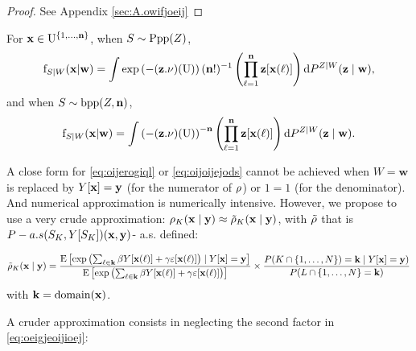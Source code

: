 \begin{proof}
See Appendix \ref{sec:A.owifjoeij}
\end{proof}



For $\mathbf{x}\in\mathrm{U}^{\{1,\ldots,\mathbf{n}\}}$, when $S\sim \mathrm{Ppp}(Z)$,
\begin{equation}\mathrm{f}_{S\mid W}(\mathbf{x}|\mathbf{w})=
\int\exp\left(-(\mathbf{z}.\nu)(\mathrm{U})\right)(\mathbf{n}!)^{-1}\left(\prod_{\ell=1}^{\mathbf{n}} \mathbf{z}[\mathbf{x}(\ell)]\right)\mathrm{d}
P^{Z\mid W}(\mathbf{z}\mid \mathbf{w}),\label{eq:oijoijejods}
\end{equation}
and when $S\sim \mathrm{bpp}(Z,\mathbf{n})$,
\begin{equation}
\mathrm{f}_{S\mid W}(\mathbf{x}|\mathbf{w})=
\int\left(-(\mathbf{z}.\nu)(\mathrm{U})\right)^{-\mathbf{n}}\left(\prod_{\ell=1}^{\mathbf{n}} \mathbf{z}[\mathbf{x}(\ell)]\right)\mathrm{d}
P^{Z\mid W}(\mathbf{z}\mid \mathbf{w}).\label{eq:oijerogiql}
\end{equation}

A close form for \eqref{eq:oijerogiql} or \eqref{eq:oijoijejods} cannot be achieved when $W=\mathbf{w}$ is replaced by $Y[\mathbf{x}]=\mathbf{y}$ (for the numerator of $\rho$) or $1=1$ (for the denominator).
And numerical approximation is numerically intensive.
However, we propose to use a very crude approximation:
$\rho_{K}(\mathbf{x}\mid\mathbf{y})\approx\tilde{\rho}_{K}(\mathbf{x}\mid\mathbf{y})$,
with 
$\tilde{\rho}$  that is $P-a.s(S_K,Y[S_K])(\mathbf{x},\mathbf{y})$- a.s. defined:

\begin{equation}\tilde{\rho}_{K}(\mathbf{x}\mid\mathbf{y})=
\frac{
\mathrm{E}\left[\exp\left(\sum_{\ell\in\mathbf{k}}\beta Y[\mathbf{x}(\ell)]+\gamma \varepsilon[\mathbf{x}(\ell)]\right)\mid Y[\mathbf{x}]=\mathbf{y}\right]}{
\mathrm{E}\left[\exp\left(\sum_{\ell\in\mathbf{k}}\beta Y[\mathbf{x}(\ell)]+\gamma \varepsilon[\mathbf{x}(\ell)]\right)\right]}\times
\frac{P(K\cap\{1,\ldots,N\})=\mathbf{k}\mid Y[\mathbf{x}]=\mathbf{y})}{P(L\cap\{1,\ldots,N\}=\mathbf{k})}\label{eq:oeigjeoijioej}
\end{equation}
with $\mathbf{k}=\mathrm{domain}(\mathbf{x})$.

A cruder approximation consists in neglecting the second factor in \eqref{eq:oeigjeoijioej}:

